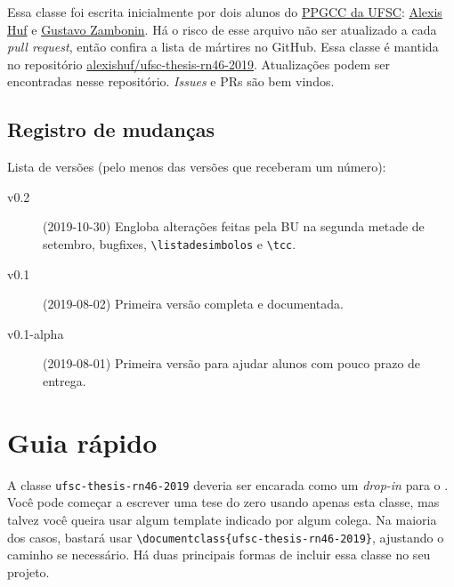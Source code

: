 \documentclass[embeddedlogo]{../ufsc-thesis-rn46-2019}
\newcommand{\lacmd}[1]{\texttt{\textbackslash{}#1}}
\begin{document}
Essa classe foi escrita inicialmente por dois alunos do
\href{http://ppgcc.posgrad.ufsc.br/}{PPGCC da UFSC}:
\href{mailto:alexishuf@gmail.com}{Alexis Huf} e
\href{mailto:gustavo.zambonin@posgrad.ufsc.br}{Gustavo Zambonin}.  Há o risco de
esse arquivo não ser atualizado a cada \textit{pull request}, então confira a
lista de mártires no GitHub. Essa classe é mantida no repositório
\href{https://github.com/alexishuf/ufsc-thesis-rn46-2019/}{alexishuf/ufsc-thesis-rn46-2019}.
Atualizações podem ser encontradas nesse repositório. \textit{Issues} e PRs são
bem vindos.

\subsection{Registro de mudanças}

Lista de versões (pelo menos das versões que receberam um número):
\begin{description}
\item[v0.2] (2019-10-30) Engloba alterações feitas pela BU na segunda metade de
  setembro, bugfixes, \lacmd{listadesimbolos} e \lacmd{tcc}.
\item[v0.1] (2019-08-02) Primeira versão completa e documentada.
\item[v0.1-alpha] (2019-08-01) Primeira versão para ajudar alunos com pouco
    prazo de entrega.
\end{description}

\section{Guia rápido}
\label{sec:quick}

A classe \texttt{ufsc-thesis-rn46-2019} deveria ser encarada como um
\emph{drop-in} para o \abnTeX. Você pode começar a escrever uma tese do zero
usando apenas esta classe, mas talvez você queira usar algum template indicado
por algum colega. Na maioria dos casos, bastará usar
\lacmd{documentclass\{ufsc-thesis-rn46-2019\}}, ajustando o caminho se necessário.
Há duas principais formas de incluir essa classe no seu projeto.
\end{document}
